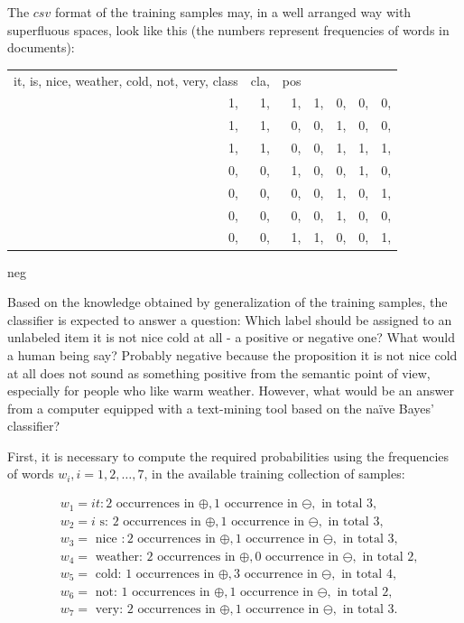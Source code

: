 \documentclass[11pt,openany,executivepaper]{book}
\begin{document}
The $c s v$ format of the training samples may, in a well arranged way with superfluous spaces, look like this (the numbers represent frequencies of words in documents):

\begin{center}
\begin{tabular}{rrrrrrr}
it, is, nice, weather, cold, not, very, class & cla, & pos &  &  &  &  \\
1, & 1, & 1, & 1, & 0, & 0, & 0, \\
1, & 1, & 0, & 0, & 1, & 0, & 0, \\
1, & 1, & 0, & 0, & 1, & 1, & 1, \\
0, & 0, & 1, & 0, & 0, & 1, & 0, \\
0, & 0, & 0, & 0, & 1, & 0, & 1, \\
0, & 0, & 0, & 0, & 1, & 0, & 0, \\
0, & 0, & 1, & 1, & 0, & 0, & 1, \\
\end{tabular}
\end{center} neg

Based on the knowledge obtained by generalization of the training samples, the classifier is expected to answer a question: Which label should be assigned to an unlabeled item it is not nice cold at all - a positive or negative one? What would a human being say? Probably negative because the proposition it is not nice cold at all does not sound as something positive from the semantic point of view, especially for people who like warm weather. However, what would be an answer from a computer equipped with a text-mining tool based on the naïve Bayes' classifier?

First, it is necessary to compute the required probabilities using the frequencies of words $w_{i}, i=1,2, \ldots, 7$, in the available training collection of samples:

$$
\begin{aligned}
& w_{1}=i t: 2 \text { occurrences in } \oplus, 1 \text { occurrence in } \ominus, \text { in total } 3, \\
& w_{2}=i \text { s: } 2 \text { occurrences in } \oplus, 1 \text { occurrence in } \ominus, \text { in total } 3, \\
& w_{3}=\text { nice }: 2 \text { occurrences in } \oplus, 1 \text { occurrence in } \ominus, \text { in total } 3, \\
& w_{4}=\text { weather: } 2 \text { occurrences in } \oplus, 0 \text { occurrence in } \ominus, \text { in total } 2, \\
& w_{5}=\text { cold: } 1 \text { occurrences in } \oplus, 3 \text { occurrence in } \ominus, \text { in total } 4, \\
& w_{6}=\text { not: } 1 \text { occurrences in } \oplus, 1 \text { occurrence in } \ominus, \text { in total } 2, \\
& w_{7}=\text { very: } 2 \text { occurrences in } \oplus, 1 \text { occurrence in } \ominus, \text { in total } 3 .
\end{aligned}
$$
\end{document}
